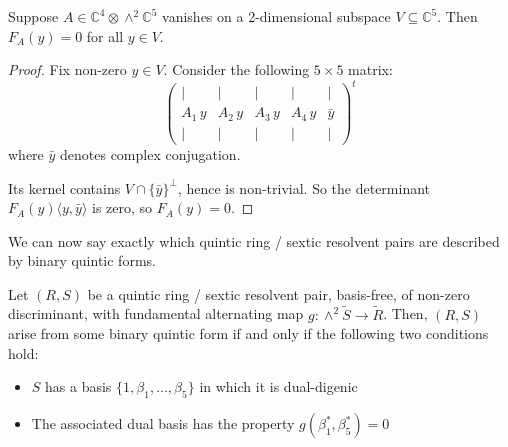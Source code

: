 \documentclass{report}
\begin{document}
\begin{lemma} \label{matrix vanish}
Suppose $A \in \mathbb{C}^4 \otimes \wedge^2 \mathbb{C}^5$ vanishes on a 2-dimensional subspace $V \subseteq \mathbb{C}^5$.  Then $F_A(y) = 0$ for all $y \in V$.
\end{lemma}
\begin{proof}
Fix non-zero $y \in V$.  Consider the following $5 \times 5$ matrix:
\begin{equation}
\begin{pmatrix}
| & | & | & | & | \\
A_1 \, y & A_2 \, y & A_3 \, y & A_4 \, y & \bar{y}  \\
| & | & | & | & |
\end{pmatrix}^t
\end{equation}
where $\bar{y}$ denotes complex conjugation.

Its kernel contains $V \cap \{ \bar{y} \}^\perp$, hence is non-trivial.  So the determinant $F_A(y) \langle y,\bar{y} \rangle$ is zero, so $F_A(y) = 0$.
\end{proof}

We can now say exactly which quintic ring / sextic resolvent pairs are described by binary quintic forms.

\begin{theorem} \label{main theorem}
Let $(R,S)$ be a quintic ring / sextic resolvent pair, basis-free, of non-zero discriminant, with fundamental alternating map $g : \wedge^2 \tilde{S} \to \tilde{R}$.  Then, $(R,S)$ arise from some binary quintic form if and only if the following two conditions hold:
\begin{itemize}
\item $S$ has a basis $\{1,\beta_1,\ldots,\beta_5\}$ in which it is dual-digenic
\item The associated dual basis has the property $g(\beta_1^*,\beta_5^*) = 0$
\end{itemize}
\end{theorem}
\end{document}
